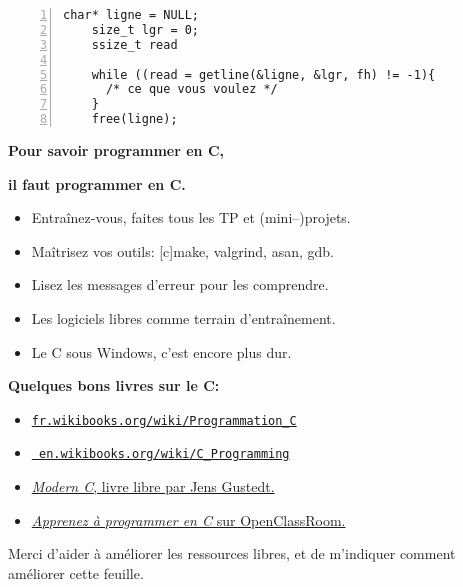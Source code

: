 \documentclass[a4paper,10pt,landscape]{article}
\newcommand{\Subsection}[1]{{\textbf{#1}}}
\begin{document}
\begin{multicols}{3}

  \smallskip
  \begin{Verbatim}[label=Lecture d'un fichier ligne à ligne, gobble=4, frame=single,
    numbers=left,numbersep=2pt]
    char* ligne = NULL;
    size_t lgr = 0;
    ssize_t read

    while ((read = getline(&ligne, &lgr, fh) != -1){
      /* ce que vous voulez */
    }
    free(ligne);
  \end{Verbatim}  

  \centerline{\bf\large Pour savoir programmer en C,}
  \centerline{\bf\large il faut programmer en C.}
  \begin{itemize}[noitemsep]
  \item Entraînez-vous, faites tous les TP et (mini--)projets.
  \item Maîtrisez vos outils: [c]make, valgrind, asan, gdb.
  \item Lisez les messages d'erreur pour les comprendre.
  \item Les logiciels libres comme terrain d'entraînement.
  \item Le C sous Windows, c'est encore plus dur.
  \end{itemize}

  \Subsection{Quelques bons livres sur le C:}
  \begin{itemize}[noitemsep,nolistsep]
  \item \href{https://fr.wikibooks.org/wiki/Programmation_C}{\tt fr.wikibooks.org/wiki/Programmation\_C}
  \item \href{https://en.wikibooks.org/wiki/C_Programming}{\tt
      en.wikibooks.org/wiki/C\_Programming}
     
  \item
    \href{http://icube-icps.unistra.fr/index.php/File:ModernC.pdf}
      {{\it Modern C}, livre libre par Jens Gustedt.}
  \item
    \href{https://openclassrooms.com/courses/apprenez-a-programmer-en-c}
    {{\it Apprenez à programmer en C} sur OpenClassRoom.}
  \end{itemize}

  \bigskip %
  Merci d'aider à améliorer les ressources libres, et de m'indiquer
  comment améliorer cette feuille.  %
  \vfill

  ~
  \columnbreak %


\end{multicols}
\end{document}
